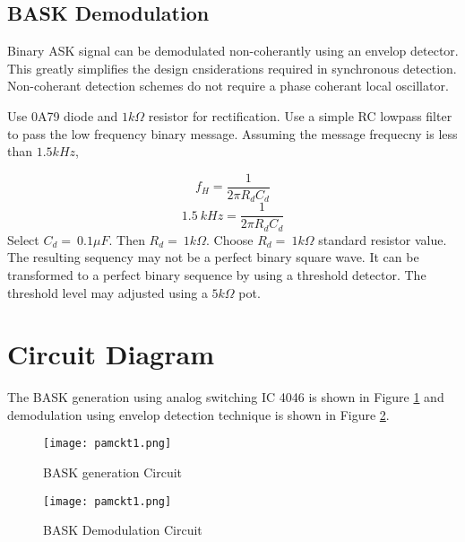 \subsection*{BASK Demodulation}

Binary ASK signal can be demodulated non-coherantly using an envelop detector. This greatly simplifies the design cnsiderations required in synchronous detection. Non-coherant detection schemes  do not require a phase coherant local oscillator. 

\noindent Use 0A79 diode and $1 k\Omega $ resistor for rectification.
\noindent Use a simple RC lowpass filter to pass the low frequency binary message. Assuming the message frequecny is less than $1.5 kHz$,
 
\begin{equation}
f_H=\frac{1}{2\pi R_dC_d}
\end{equation}
\begin{equation}
1.5\ kHz=\frac{1}{2\pi R_dC_d}
\end{equation}
\noindent Select $C_d=\ 0.1 \mu F$. Then $R_d=\ 1k\Omega$.
Choose $R_d=\ 1k\Omega$ standard resistor value.\\

The resulting sequency may not be a perfect binary square wave. It can be transformed to a perfect binary sequence by using a threshold detector. The threshold level may adjusted using a $5 k\Omega$ pot.

\section*{Circuit Diagram}

The BASK generation using analog switching IC 4046 is shown in Figure \ref{bask-gen} and demodulation using envelop detection technique is shown in Figure \ref{bask-det}.

\begin{figure}
\texttt{[image: pamckt1.png]}
\caption{BASK generation Circuit}
\label{bask-gen}
\end{figure}

\begin{figure}
	\texttt{[image: pamckt1.png]}
	\caption{BASK Demodulation Circuit}
	\label{bask-det}
\end{figure}


